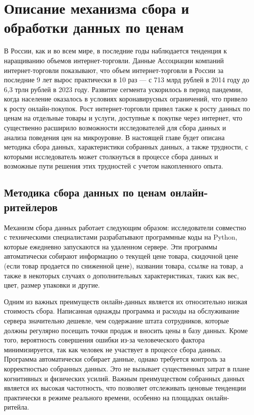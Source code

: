 \chapter{Описание механизма сбора и обработки данных по ценам}\label{ch:ch2}
В России, как и во всем мире, в последние годы наблюдается тенденция к наращиванию объемов интернет-торговли. Данные Ассоциации компаний интернет-торговли показывают, что объем интернет-торговли в России за последние 9 лет вырос практически в 10 раз  --- с 713 млрд рублей в 2014 году до 6,3 трлн рублей в 2023 году. Развитие сегмента ускорилось в период пандемии, когда население оказалось в условиях коронавирусных ограничений, что привело к росту онлайн-покупок. Рост интернет-торговли привел также к росту данных по ценам на отдельные товары и услуги, доступные к покупке через интернет, что существенно расширило возможности исследователей для сбора данных и анализа поведения цен на микроуровне. В настоящей главе будет описана методика сбора данных, характеристики собранных данных, а также трудности, с которыми исследователь может столкнуться в процессе сбора данных и возможные пути решения этих трудностей с учетом накопленного опыта.
\section{Методика сбора данных по ценам онлайн-ритейлеров}\label{sec:ch2/sec1}

Механизм сбора данных работает следующим образом: исследователи совместно с техническими специалистами разрабатывают программные коды на Python, которые ежедневно запускаются на удаленном сервере. Эти программы автоматически собирают информацию о текущей цене товара, скидочной цене (если товар продается по сниженной цене), названии товара, ссылке на товар, а также в некоторых случаях о дополнительных характеристиках, таких как вес, цвет, размер упаковки и другие.

Одним из важных преимуществ онлайн-данных является их относительно низкая стоимость сбора. Написанная однажды программа и расходы на обслуживание сервера значительно дешевле, чем содержание штата сотрудников, которые должны регулярно посещать точки продаж и вносить цены в базу данных. Кроме того, вероятность совершения ошибки из-за человеческого фактора минимизируется, так как человек не участвует в процессе сбора данных. Программа автоматически собирает данные, однако требуется контроль за корректностью собранных данных. Это не вызывает существенных затрат в плане когнитивных и физических усилий. Важным преимуществом собранных данных является их высокая частотность, что позволяет отслеживать ценовые тенденции практически в режиме реального времени, особенно на площадках онлайн-ритейла.

